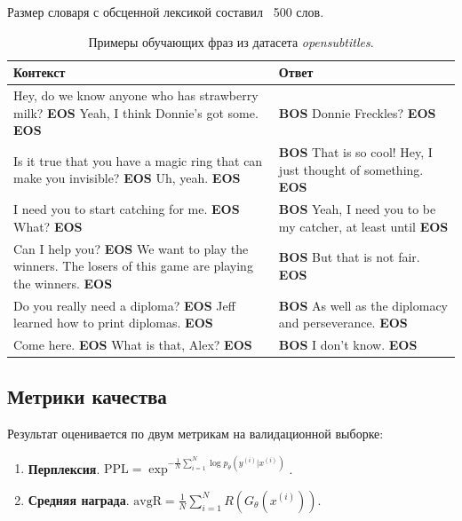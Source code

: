 \documentclass[12pt,a4paper]{amsart}
\begin{document}
Размер словаря с обсценной лексикой составил ~500 слов.

\begin{center}
\begin{table}[htbp]
\caption{Примеры обучающих фраз из датасета \textit{opensubtitles}.}
\label{table:opensub-data}
\begin{tabulary}{\textwidth}{|L|L|}
	\hline
	Контекст & Ответ \\
	\hline \hline
	Hey, do we know anyone who has strawberry milk? \textbf{EOS} Yeah, I think Donnie's got some. \textbf{EOS} & \textbf{BOS} Donnie Freckles? \textbf{EOS} \\
	\hline
	Is it true that you have a magic ring that can make you invisible? \textbf{EOS} Uh, yeah. \textbf{EOS} & \textbf{BOS} That is so cool! Hey, I just thought of something. \textbf{EOS} \\
	\hline
	I need you to start catching for me. \textbf{EOS} What? \textbf{EOS} & \textbf{BOS} Yeah, I need you to be my catcher, at least until \textbf{EOS} \\
	\hline 
	Can I help you? \textbf{EOS} We want to play the winners. The losers of this game are playing the winners. \textbf{EOS} & \textbf{BOS} But that is not fair. \textbf{EOS} \\
	\hline
	Do you really need a diploma? \textbf{EOS} Jeff learned how to print diplomas. \textbf{EOS} & \textbf{BOS} As well as the diplomacy and perseverance. \textbf{EOS} \\
	\hline
	Come here. \textbf{EOS} What is that, Alex? \textbf{EOS} & \textbf{BOS} I don't know. \textbf{EOS} \\
	\hline 
\end{tabulary}
\end{table}
\end{center}


\subsection{Метрики качества}

Результат оценивается по двум метрикам на валидационной выборке:

\begin{enumerate}
	\item \textbf{Перплексия}. $\text{PPL} = \exp^{-\frac{1}{N}\sum_{i=1}^N \log p_\theta (y^{(i)} | x^{(i)})}$.
	\item \textbf{Средняя награда}. $\text{avgR} = \frac{1}{N}\sum_{i=1}^N R(G_\theta(x^{(i)}))$.
\end{enumerate}
\end{document}
